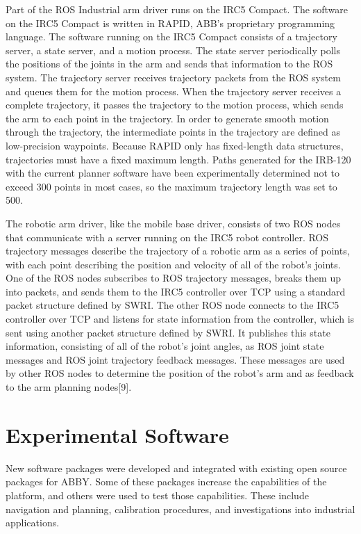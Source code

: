 \documentclass[]{cwru} %
\begin{document}
Part of the ROS Industrial arm driver runs on the IRC5 Compact. The
software on the IRC5 Compact is written in RAPID, ABB's proprietary
programming language. The software running on the IRC5 Compact consists
of a trajectory server, a state server, and a motion process. The state
server periodically polls the positions of the joints in the arm and
sends that information to the ROS system. The trajectory server receives
trajectory packets from the ROS system and queues them for the motion
process. When the trajectory server receives a complete trajectory, it
passes the trajectory to the motion process, which sends the arm to each
point in the trajectory. In order to generate smooth motion through the
trajectory, the intermediate points in the trajectory are defined as
low-precision waypoints. Because RAPID only has fixed-length data
structures, trajectories must have a fixed maximum length. Paths
generated for the IRB-120 with the current planner software have been
experimentally determined not to exceed 300 points in most cases, so the
maximum trajectory length was set to 500.

The robotic arm driver, like the mobile base driver, consists of two ROS
nodes that communicate with a server running on the IRC5 robot
controller. ROS trajectory messages describe the trajectory of a robotic
arm as a series of points, with each point describing the position and
velocity of all of the robot's joints. One of the ROS nodes subscribes
to ROS trajectory messages, breaks them up into packets, and sends them
to the IRC5 controller over TCP using a standard packet structure
defined by SWRI. The other ROS node connects to the IRC5 controller over
TCP and listens for state information from the controller, which is sent
using another packet structure defined by SWRI. It publishes this state
information, consisting of all of the robot's joint angles, as ROS joint
state messages and ROS joint trajectory feedback messages. These
messages are used by other ROS nodes to determine the position of the
robot's arm and as feedback to the arm planning nodes{[}9{]}.

\chapter{Experimental Software}

New software packages were developed
and integrated with existing open source packages for ABBY. Some of
these packages increase the capabilities of the platform, and others
were used to test those capabilities. These include navigation and
planning, calibration procedures, and investigations into industrial
applications.
\end{document}
